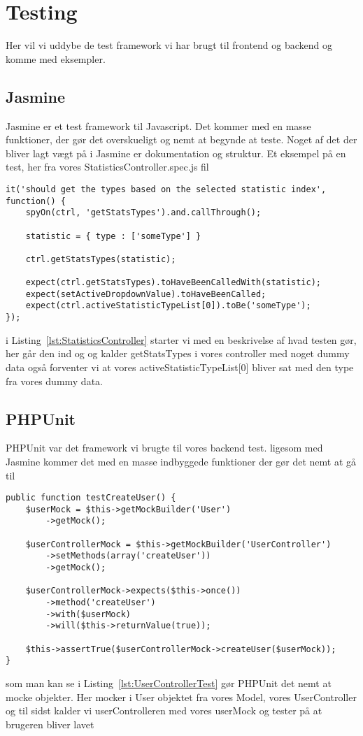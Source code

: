 \section{Testing}
Her vil vi uddybe de test framework vi har brugt til frontend og backend og komme
med eksempler.
\subsection{Jasmine}
Jasmine er et test framework til Javascript. Det kommer med en masse funktioner, 
der gør det overskueligt og nemt at begynde at teste.
Noget af det der bliver lagt vægt på i Jasmine er dokumentation og struktur.
Et eksempel på en test, her fra vores StatisticsController.spec.js fil
\begin{lstlisting}[caption={StatisticsController.spec.js}, label={lst:StatisticsController}]
it('should get the types based on the selected statistic index', function() {
    spyOn(ctrl, 'getStatsTypes').and.callThrough();

    statistic = { type : ['someType'] }

    ctrl.getStatsTypes(statistic);

    expect(ctrl.getStatsTypes).toHaveBeenCalledWith(statistic);
    expect(setActiveDropdownValue).toHaveBeenCalled;
    expect(ctrl.activeStatisticTypeList[0]).toBe('someType');
});
\end{lstlisting}
i Listing~\ref{lst:StatisticsController} starter vi med en beskrivelse af hvad testen gør, her går den ind og og kalder getStatsTypes i vores controller
med noget dummy data også forventer vi at vores activeStatisticTypeList[0] bliver sat med den type fra vores dummy data.
\subsection{PHPUnit}
PHPUnit var det framework vi brugte til vores backend test. ligesom med Jasmine kommer det med
en masse indbyggede funktioner der gør det nemt at gå til
\begin{lstlisting}[caption={UserControllerTest.php}, label={lst:UserControllerTest}]
public function testCreateUser() {
    $userMock = $this->getMockBuilder('User')
        ->getMock();

    $userControllerMock = $this->getMockBuilder('UserController')
        ->setMethods(array('createUser'))
        ->getMock();

    $userControllerMock->expects($this->once())
        ->method('createUser')
        ->with($userMock)
        ->will($this->returnValue(true));

    $this->assertTrue($userControllerMock->createUser($userMock));
}
\end{lstlisting}
som man kan se i Listing~\ref{lst:UserControllerTest} gør PHPUnit det nemt at mocke objekter.
Her mocker i User objektet fra vores Model, vores UserController og til sidst kalder vi userControlleren 
med vores userMock og tester på at brugeren bliver lavet

